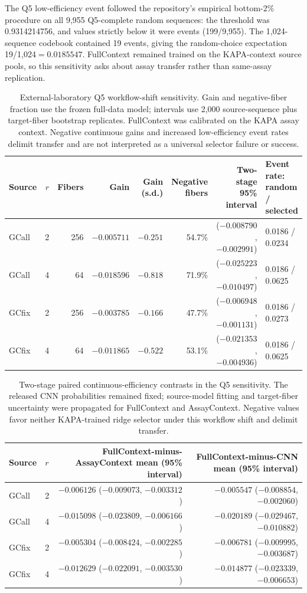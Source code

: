 \documentclass[10pt]{article}
\begin{document}
The Q5 low-efficiency event followed the repository's empirical bottom-2\% procedure on all 9,955 Q5-complete random sequences: the threshold was 0.9314214756, and values strictly below it were events (199/9,955). The 1,024-sequence codebook contained 19 events, giving the random-choice expectation 19/1,024$=0.0185547$. FullContext remained trained on the KAPA-context source pools, so this sensitivity asks about assay transfer rather than same-assay replication.

\begin{table}[H]
\centering
\scriptsize
\begin{tabular}{lrrrrrrl}
\toprule
Source & $r$ & Fibers & Gain & Gain (s.d.) & Negative fibers & Two-stage 95\% interval & Event rate: random / selected \\
\midrule
GCall & 2 & 256 & $-0.005711$ & $-0.251$ & 54.7\% & ($-0.008790$, $-0.002991$) & 0.0186 / 0.0234 \\
GCall & 4 & 64 & $-0.018596$ & $-0.818$ & 71.9\% & ($-0.025223$, $-0.010497$) & 0.0186 / 0.0625 \\
GCfix & 2 & 256 & $-0.003785$ & $-0.166$ & 47.7\% & ($-0.006948$, $-0.001131$) & 0.0186 / 0.0273 \\
GCfix & 4 & 64 & $-0.011865$ & $-0.522$ & 53.1\% & ($-0.021353$, $-0.004936$) & 0.0186 / 0.0625 \\
\bottomrule
\end{tabular}
\caption{External-laboratory Q5 workflow-shift sensitivity. Gain and negative-fiber fraction use the frozen full-data model; intervals use 2,000 source-sequence plus target-fiber bootstrap replicates. FullContext was calibrated on the KAPA assay context. Negative continuous gains and increased low-efficiency event rates delimit transfer and are not interpreted as a universal selector failure or success.}
\label{tab:s-q5}
\end{table}

\begin{table}[H]
\centering
\scriptsize
\begin{tabular}{llrr}
\toprule
Source & $r$ & FullContext-minus-AssayContext mean (95\% interval) & FullContext-minus-CNN mean (95\% interval) \\
\midrule
GCall & 2 & $-0.006126$ ($-0.009073$, $-0.003312$) & $-0.005547$ ($-0.008854$, $-0.002060$) \\
GCall & 4 & $-0.015098$ ($-0.023809$, $-0.006166$) & $-0.020189$ ($-0.029467$, $-0.010882$) \\
GCfix & 2 & $-0.005304$ ($-0.008424$, $-0.002285$) & $-0.006781$ ($-0.009995$, $-0.003687$) \\
GCfix & 4 & $-0.012629$ ($-0.022091$, $-0.003530$) & $-0.014877$ ($-0.023339$, $-0.006653$) \\
\bottomrule
\end{tabular}
\caption{Two-stage paired continuous-efficiency contrasts in the Q5 sensitivity. The released CNN probabilities remained fixed; source-model fitting and target-fiber uncertainty were propagated for FullContext and AssayContext. Negative values favor neither KAPA-trained ridge selector under this workflow shift and delimit transfer.}
\label{tab:s-q5-paired}
\end{table}
\end{document}
